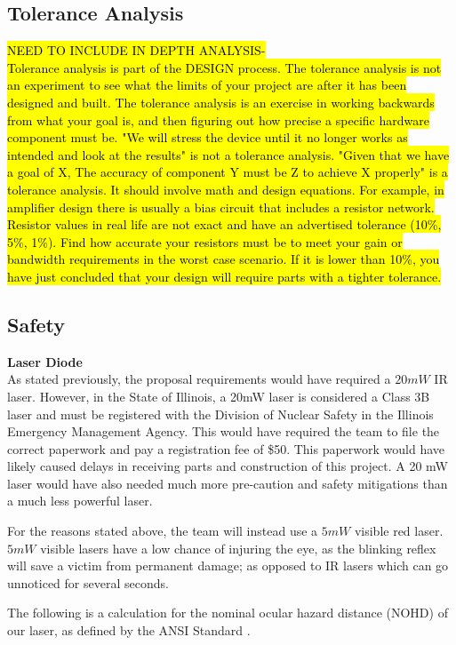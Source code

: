 \documentclass[letterpaper,10pt]{article}
\begin{document}
\begin{spacing}{1.15}
\subsection{Tolerance Analysis}
\hl{NEED TO INCLUDE IN DEPTH ANALYSIS-\\
	Tolerance analysis is part of the DESIGN process. The tolerance analysis is not an experiment to see what the limits of your project are after it has been designed and built. The tolerance analysis is an exercise in working backwards from what your goal is, and then figuring out how precise a specific hardware component must be. "We will stress the device until it no longer works as intended and look at the results" is not a tolerance analysis. "Given that we have a goal of X, The accuracy of component Y must be Z to achieve X properly" is a tolerance analysis. It should involve math and design equations. For example, in amplifier design there is usually a bias circuit that includes a resistor network. Resistor values in real life are not exact and have an advertised tolerance (10\%, 5\%, 1\%). Find how accurate your resistors must be to meet your gain or bandwidth requirements in the worst case scenario. If it is lower than 10\%, you have just concluded that your design will require parts with a tighter tolerance.}

\subsection{Safety} \label{section-safety-ethics}
\normalsize\textbf{Laser Diode} \\
As stated previously, the proposal requirements would have required a $20mW$ IR laser. However, in the State of Illinois, a 20mW laser is considered a Class 3B laser and must be registered with the Division of Nuclear Safety in the Illinois Emergency Management Agency. This would have required the team to file the correct paperwork and pay a registration fee of \$50. This paperwork would have likely caused delays in receiving parts and construction of this project. A 20 mW laser would have also needed much more pre-caution and safety mitigations than a much less powerful laser.

For the reasons stated above, the team will instead use a $5mW$ visible red laser. $5mW$ visible lasers have a low chance of injuring the eye, as the blinking reflex will save a victim from permanent damage; as opposed to IR lasers which can go unnoticed for several seconds. 

The following is a calculation for the nominal ocular hazard distance (NOHD) of our laser, as defined by the ANSI Standard \cite{ANSI}.


\end{spacing}
\end{document}
